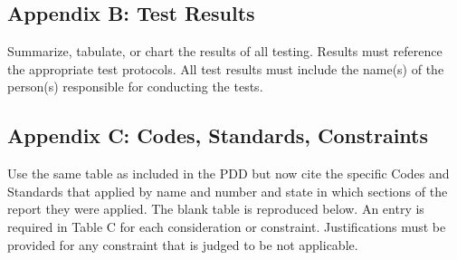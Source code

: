 \documentclass[12pt,a4paper]{report}
\begin{document}
\subsection{Appendix B: Test Results}
Summarize, tabulate, or chart the results of all testing. Results must reference the appropriate test protocols.  All test results must include the name(s) of the person(s) responsible for conducting the tests.\\
%
\subsection{Appendix C: Codes, Standards, Constraints}
Use the same table as included in the PDD but now cite the specific Codes and Standards that applied by name and number and state in which sections of the report they were applied.  The blank table is reproduced below.  An entry is required in Table C for each consideration or constraint.  Justifications must be provided for any constraint that is judged to be not applicable.\\
%
\end{document}
